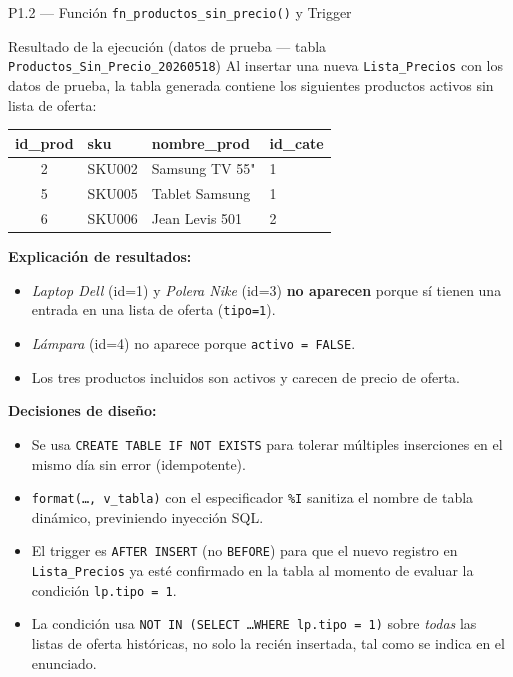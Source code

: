 \documentclass[12pt,a4paper]{article}
\begin{document}
\begin{querybox}{P1.2 --- Función \texttt{fn\_productos\_sin\_precio()} y Trigger}
\vspace{0.4cm}

\begin{resultbox}{Resultado de la ejecución (datos de prueba --- tabla \texttt{Productos\_Sin\_Precio\_20260518})}
Al insertar una nueva \texttt{Lista\_Precios} con los datos de prueba,
la tabla generada contiene los siguientes productos activos sin lista de oferta:

\begin{center}
\begin{tabular}{clll}
  \toprule
  \textbf{id\_prod} & \textbf{sku} & \textbf{nombre\_prod} & \textbf{id\_cate} \\
  \midrule
  2 & SKU002 & Samsung TV 55"  & 1 \\
  5 & SKU005 & Tablet Samsung  & 1 \\
  6 & SKU006 & Jean Levis 501  & 2 \\
  \bottomrule
\end{tabular}
\end{center}

\footnotesize
\textbf{Explicación de resultados:}
\begin{itemize}[leftmargin=1.5em,itemsep=1pt]
  \item \textit{Laptop Dell} (id=1) y \textit{Polera Nike} (id=3) \textbf{no aparecen}
        porque sí tienen una entrada en una lista de oferta (\texttt{tipo=1}).
  \item \textit{Lámpara} (id=4) no aparece porque \texttt{activo = FALSE}.
  \item Los tres productos incluidos son activos y carecen de precio de oferta.
\end{itemize}
\end{resultbox}

\vspace{0.3cm}
\textbf{Decisiones de diseño:}
\begin{itemize}[leftmargin=1.5em,itemsep=2pt]
  \item Se usa \texttt{CREATE TABLE IF NOT EXISTS} para tolerar múltiples
        inserciones en el mismo día sin error (idempotente).
  \item \texttt{format(\ldots, v\_tabla)} con el especificador \texttt{\%I}
        sanitiza el nombre de tabla dinámico, previniendo inyección SQL.
  \item El trigger es \texttt{AFTER INSERT} (no \texttt{BEFORE}) para que el
        nuevo registro en \texttt{Lista\_Precios} ya esté confirmado en la
        tabla al momento de evaluar la condición \texttt{lp.tipo = 1}.
  \item La condición usa \texttt{NOT IN (SELECT \ldots WHERE lp.tipo = 1)}
        sobre \textit{todas} las listas de oferta históricas, no solo la
        recién insertada, tal como se indica en el enunciado.
\end{itemize}

\end{querybox}
\end{document}
